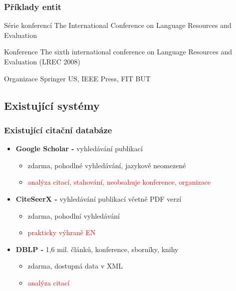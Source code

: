 \documentclass{beamer}
\begin{document}
\begin{frame}
  \frametitle{Příklady entit}
  \begin{block}{Série konferencí}
    The International Conference on Language Resources and Evaluation
  \end{block}

  \begin{block}{Konference}
    The sixth international conference on Language Resources and Evaluation (LREC 2008)
  \end{block}

  \begin{block}{Organizace}
    Springer US, IEEE Press, FIT BUT
  \end{block}
\end{frame}

\subsection{Existující systémy}
\begin{frame}
  \frametitle{Existující citační databáze}
  \begin{itemize}
    \item {\textbf{Google Scholar -} vyhledávání publikací}
      \begin{itemize}
        \item \textcolor{green!50!black}{zdarma, pohodlné vyhledávání, jazykově neomezené}
        \item \textcolor{red}{analýza citací, stahování, neobsahuje konference, organizace}
      \end{itemize}
    \item {\textbf{CiteSeerX -} vyhledávání publikací včetně PDF verzí}
      \begin{itemize}
        \item \textcolor{green!50!black}{zdarma, pohodlní vyhledávání}
        \item \textcolor{red}{prakticky výhraně EN}
      \end{itemize}
    \item {\textbf{DBLP -} 1,6 mil. článků, konference, sborníky, knihy}
      \begin{itemize}
        \item \textcolor{green!50!black}{zdarma, dostupná data v XML}
        \item \textcolor{red}{analýza citací}
      \end{itemize}
  \end{itemize}
\end{frame}
\end{document}
